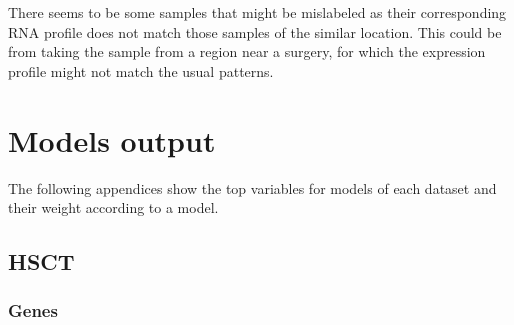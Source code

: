 \documentclass[
  12pt,
  a4paper,
  twoside,
  openright]{book}
\begin{document}
There seems to be some samples that might be mislabeled as their corresponding RNA profile does not match those samples of the similar location.
This could be from taking the sample from a region near a surgery, for which the expression profile might not match the usual patterns.

\hypertarget{models-output}{%
\chapter{Models output}\label{models-output}}

The following appendices show the top variables for models of each dataset and their weight according to a model.

\hypertarget{hsct}{%
\section{HSCT}\label{hsct}}

\hypertarget{genes}{%
\subsection{Genes}\label{genes}}
\end{document}
